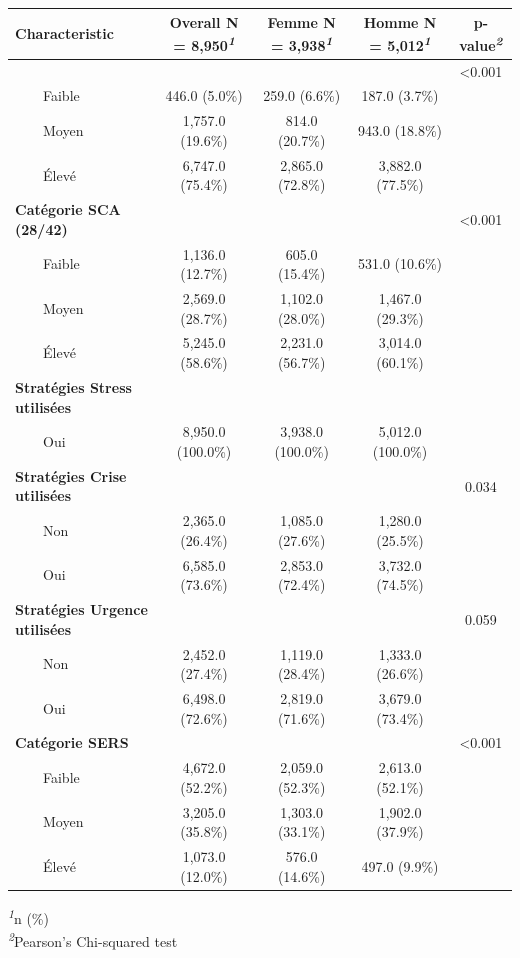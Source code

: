 \documentclass[
]{article}
\begin{document}
\begin{table}[!t]
\fontsize{9.8pt}{11.7pt}\selectfont
\begin{tabular*}{\linewidth}{@{\extracolsep{\fill}}lcccc}
\toprule
\textbf{Characteristic} & \textbf{Overall}  N = 8,950\textsuperscript{\textit{1}} & \textbf{Femme}  N = 3,938\textsuperscript{\textit{1}} & \textbf{Homme}  N = 5,012\textsuperscript{\textit{1}} & \textbf{p-value}\textsuperscript{\textit{2}} \\ 
\midrule\addlinespace[2.5pt]
{\bfseries Catégorie SCA (21/35)} &  &  &  & <0.001 \\ 
    Faible & 446.0 (5.0\%) & 259.0 (6.6\%) & 187.0 (3.7\%) &  \\ 
    Moyen & 1,757.0 (19.6\%) & 814.0 (20.7\%) & 943.0 (18.8\%) &  \\ 
    Élevé & 6,747.0 (75.4\%) & 2,865.0 (72.8\%) & 3,882.0 (77.5\%) &  \\ 
{\bfseries Catégorie SCA (28/42)} &  &  &  & <0.001 \\ 
    Faible & 1,136.0 (12.7\%) & 605.0 (15.4\%) & 531.0 (10.6\%) &  \\ 
    Moyen & 2,569.0 (28.7\%) & 1,102.0 (28.0\%) & 1,467.0 (29.3\%) &  \\ 
    Élevé & 5,245.0 (58.6\%) & 2,231.0 (56.7\%) & 3,014.0 (60.1\%) &  \\ 
{\bfseries Stratégies Stress utilisées} &  &  &  &  \\ 
    Oui & 8,950.0 (100.0\%) & 3,938.0 (100.0\%) & 5,012.0 (100.0\%) &  \\ 
{\bfseries Stratégies Crise utilisées} &  &  &  & 0.034 \\ 
    Non & 2,365.0 (26.4\%) & 1,085.0 (27.6\%) & 1,280.0 (25.5\%) &  \\ 
    Oui & 6,585.0 (73.6\%) & 2,853.0 (72.4\%) & 3,732.0 (74.5\%) &  \\ 
{\bfseries Stratégies Urgence utilisées} &  &  &  & 0.059 \\ 
    Non & 2,452.0 (27.4\%) & 1,119.0 (28.4\%) & 1,333.0 (26.6\%) &  \\ 
    Oui & 6,498.0 (72.6\%) & 2,819.0 (71.6\%) & 3,679.0 (73.4\%) &  \\ 
{\bfseries Catégorie SERS} &  &  &  & <0.001 \\ 
    Faible & 4,672.0 (52.2\%) & 2,059.0 (52.3\%) & 2,613.0 (52.1\%) &  \\ 
    Moyen & 3,205.0 (35.8\%) & 1,303.0 (33.1\%) & 1,902.0 (37.9\%) &  \\ 
    Élevé & 1,073.0 (12.0\%) & 576.0 (14.6\%) & 497.0 (9.9\%) &  \\ 
\bottomrule
\end{tabular*}
\begin{minipage}{\linewidth}
\textsuperscript{\textit{1}}n (\%)\\
\textsuperscript{\textit{2}}Pearson's Chi-squared test\\
\end{minipage}
\end{table}
\end{document}
